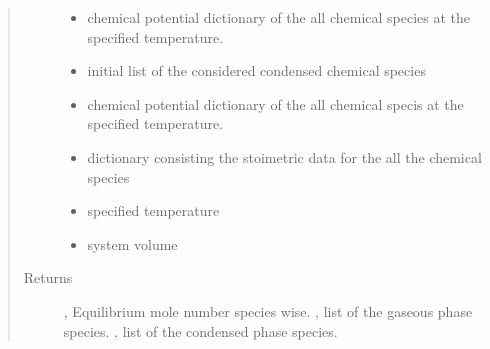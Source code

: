 \documentclass[letterpaper,10pt,english]{sphinxmanual}
\begin{document}
\begin{fulllineitems}
\begin{quote}
\begin{description}
\begin{itemize}
\item {} 
 \textendash{} chemical potential dictionary of the all chemical species at the specified temperature.

\item {} 
 \textendash{} initial list of the considered condensed chemical species

\item {} 
 \textendash{} chemical potential dictionary of the all chemical specis at the specified temperature.

\item {} 
 \textendash{} dictionary consisting the stoimetric data for the all the chemical species

\item {} 
 \textendash{} specified temperature

\item {} 
 \textendash{} system volume

\end{itemize}

\item[{Returns}] \leavevmode
{}, Equilibrium mole number species wise. , list of the gaseous phase species. , list of the condensed phase species.

\end{description}\end{quote}

\end{fulllineitems}
\end{document}
